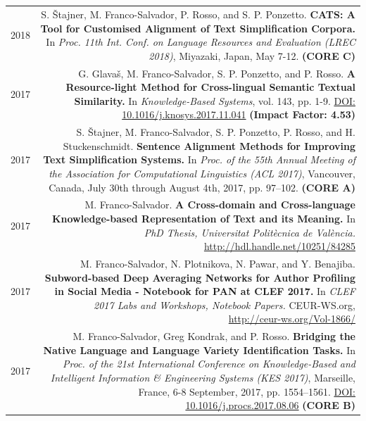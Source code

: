 \documentclass[10pt]{article}
\begin{document}
\section*{}
\begin{tabular}{L!{\VRule}R}	
    2018 & S. \v{S}tajner, M. Franco-Salvador, P. Rosso, and S. P. Ponzetto. \textbf{CATS: A Tool for Customised Alignment of Text Simplification Corpora.} In \emph{Proc. 11th Int. Conf. on Language Resources and Evaluation (LREC 2018)}, Miyazaki, Japan, May 7-12. \textbf{(CORE C)} \vspace{5pt}\\
    2017 & G. Glava{\v s}, M. Franco-Salvador, S. P. Ponzetto, and P. Rosso. \textbf{A Resource-light Method for Cross-lingual Semantic Textual Similarity.}
	In \emph{Knowledge-Based Systems}, vol. 143, pp. 1-9. \href{https://doi.org/10.1016/j.knosys.2017.11.041}{DOI: 10.1016/j.knosys.2017.11.041} \textbf{(Impact Factor: 4.53)} \vspace{5pt}\\	
	2017& S. \v{S}tajner, M. Franco-Salvador, S. P. Ponzetto, P. Rosso, and H. Stuckenschmidt. \textbf{Sentence Alignment Methods for Improving Text Simplification Systems.}
	In \emph{Proc. of the 55th Annual Meeting of the Association for Computational Linguistics (ACL 2017)},  Vancouver, Canada, July 30th through August 4th, 2017, pp. 97--102. \textbf{(CORE A)}\vspace{5pt}\\
	2017& M. Franco-Salvador. \textbf{A Cross-domain and Cross-language Knowledge-based Representation of Text and its Meaning.}
	In \emph{PhD Thesis, Universitat Polit{\`e}cnica de Val{\`e}ncia.} \href{http://hdl.handle.net/10251/84285}{http://hdl.handle.net/10251/84285}\vspace{5pt}\\
	2017& M. Franco-Salvador, N. Plotnikova, N. Pawar, and Y. Benajiba. \textbf{Subword-based Deep Averaging Networks for Author Profiling in Social Media - Notebook for PAN at CLEF 2017.}
	In \emph{CLEF 2017 Labs and Workshops, Notebook Papers.} CEUR-WS.org, \href{http://ceur-ws.org/Vol-1866/}{http://ceur-ws.org/Vol-1866/} \vspace{5pt}\\
    2017&M. Franco-Salvador, Greg Kondrak, and P. Rosso. \textbf{Bridging the Native Language and Language Variety Identification Tasks.}
	In \emph{Proc. of the 21st International Conference on Knowledge-Based and Intelligent Information \& Engineering Systems (KES 2017)}, Marseille, France, 6-8 September, 2017, pp. 1554--1561. \href{https://doi.org/10.1016/j.procs.2017.08.068}{DOI: 10.1016/j.procs.2017.08.06} \textbf{(CORE B)}\vspace{5pt}\\

\end{tabular}
\end{document}
